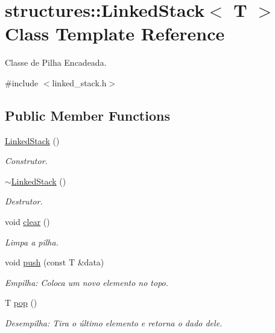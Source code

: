 \hypertarget{classstructures_1_1LinkedStack}{}\section{structures\+:\+:Linked\+Stack$<$ T $>$ Class Template Reference}
\label{classstructures_1_1LinkedStack}


Classe de Pilha Encadeada.  




{\ttfamily \#include $<$linked\+\_\+stack.\+h$>$}

\subsection*{Public Member Functions}
\begin{DoxyCompactItemize}
\item 
\hyperlink{classstructures_1_1LinkedStack_a546b827cccaa49b4f470110bc3a9004e}{Linked\+Stack} ()
\begin{DoxyCompactList}\small\item\em Construtor. \end{DoxyCompactList}\item 
\hyperlink{classstructures_1_1LinkedStack_aae17566eb103c92eb22be2e779286f2f}{$\sim$\+Linked\+Stack} ()
\begin{DoxyCompactList}\small\item\em Destrutor. \end{DoxyCompactList}\item 
void \hyperlink{classstructures_1_1LinkedStack_a56cc909b4a3a0ff7a589f35032ca0ba8}{clear} ()
\begin{DoxyCompactList}\small\item\em Limpa a pilha. \end{DoxyCompactList}\item 
void \hyperlink{classstructures_1_1LinkedStack_adb8c6b231298ac25b17ba692d510a3fc}{push} (const T \&data)
\begin{DoxyCompactList}\small\item\em Empilha\+: Coloca um novo elemento no topo. \end{DoxyCompactList}\item 
T \hyperlink{classstructures_1_1LinkedStack_a8ff0ba0de594ec26971bb259e1d28c3c}{pop} ()
\begin{DoxyCompactList}\small\item\em Desempilha\+: Tira o último elemento e retorna o dado dele. \end{DoxyCompactList}\item 

\end{DoxyCompactItemize}
